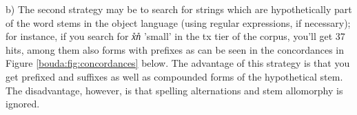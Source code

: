 b) The second strategy may be to search for strings which are hypothetically part of the word stems in the object language (using regular expressions, if necessary); for instance, if you search for \textit{x{\U}n{\U}} 'small' in the tx tier of the corpus, you'll get 37 hits, among them also forms with prefixes as can be seen in the concordances in Figure \ref{bouda:fig:concordances} below. The advantage of this strategy is that you get prefixed and suffixes as well as compounded forms of the hypothetical stem. The disadvantage, however, is that spelling alternations and stem allomorphy is ignored.
% 
% 

